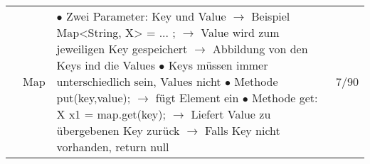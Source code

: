 \documentclass[11pt,a4paper]{article}
\begin{document}
\begin{center}
\begin{longtable}[h]{ | p{2.3cm} | p{2.3cm} | p{12.6cm} | p{1.2cm} | }
	& Map & \makecell[l]{$\bullet$ Zwei Parameter: Key und Value \\
	\hspace{0.4cm} $\rightarrow$ Beispiel Map<String, X> = ... ; \\
	\hspace{0.4cm} $\rightarrow$ Value wird zum jeweiligen Key gespeichert \\
	\hspace{0.4cm} $\rightarrow$ Abbildung von den Keys ind die Values \\
	$\bullet$ Keys müssen immer unterschiedlich sein, Values nicht \\
	$\bullet$ Methode put(key,value); \\
	\hspace{0.4cm} $\rightarrow$ fügt Element ein \\
	$\bullet$ Methode get: X x1 = map.get(key); \\
	\hspace{0.4cm} $\rightarrow$ Liefert Value zu übergebenen Key zurück \\
	\hspace{0.4cm} $\rightarrow$ Falls Key nicht vorhanden, return null}  & 7/90 \\ \cline{2-4}
	

\end{longtable}
\end{center}
\end{document}
